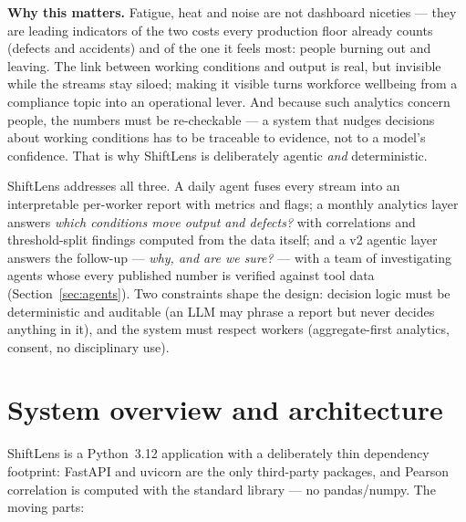 \documentclass[11pt,a4paper]{article}
\begin{document}
\textbf{Why this matters.} Fatigue, heat and noise are not dashboard
niceties --- they are leading indicators of the two costs every production
floor already counts (defects and accidents) and of the one it feels most:
people burning out and leaving. The link between working conditions and
output is real, but invisible while the streams stay siloed; making it
visible turns workforce wellbeing from a compliance topic into an
operational lever. And because such analytics concern people, the numbers
must be re-checkable --- a system that nudges decisions about working
conditions has to be traceable to evidence, not to a model's confidence.
That is why ShiftLens is deliberately agentic \emph{and} deterministic.

ShiftLens addresses all three. A daily agent fuses every stream into an
interpretable per-worker report with metrics and flags; a monthly analytics
layer answers \emph{which conditions move output and defects?} with
correlations and threshold-split findings computed from the data itself;
and a v2 agentic layer answers the follow-up --- \emph{why, and are we
sure?} --- with a team of investigating agents whose every published number
is verified against tool data (Section~\ref{sec:agents}). Two constraints shape the design:
decision logic must be deterministic and auditable (an LLM may phrase a
report but never decides anything in it), and the system must respect
workers (aggregate-first analytics, consent, no disciplinary use).

\section{System overview and architecture}
ShiftLens is a Python~3.12 application with a deliberately thin dependency
footprint: FastAPI and uvicorn are the only third-party packages, and
Pearson correlation is computed with the standard library --- no
pandas/numpy. The moving parts:
\end{document}
